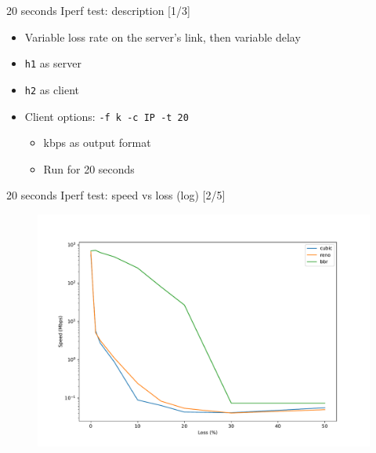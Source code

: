 \documentclass[13pt,aspectratio=43]{beamer}
\begin{document}
\begin{frame}{20 seconds Iperf test: description [1/3]}
	\begin{itemize}
		\item Variable loss rate on the server's link, then variable delay
		\item \texttt{h1} as server
		\item \texttt{h2} as client
		\item Client options: \texttt{-f k -c IP -t 20 }
			\begin{itemize}
				\item[-f k] kbps as output format
				\item[-t 20] Run for 20 seconds
			\end{itemize}
	\end{itemize}
\end{frame}

\begin{frame}{20 seconds Iperf test: speed vs loss (log) [2/5]}
  \begin{figure}
	  \includegraphics[width=\textwidth,height=\textheight,keepaspectratio]{../iperf_test/plot_log.pdf}
  \end{figure}
\end{frame}
\end{document}
